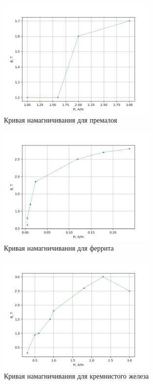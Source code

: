 \documentclass[14pt,a4paper]{article}
\begin{document}
\newpage
\begin{figure}[H]
  \includegraphics*[width=0.7\textwidth]{p1.png}
  \caption{Кривая намагничивания для премалоя}
\end{figure}
\begin{figure}[H]
  \includegraphics*[width=0.7\textwidth]{p2.png}
  \caption{Кривая намагничивания для феррита}
\end{figure}
\begin{figure}[H]
  \includegraphics*[width=0.7\textwidth]{p3.png}
  \caption{Кривая намагничивания для кремнистого железа}
\end{figure}
\end{document}
